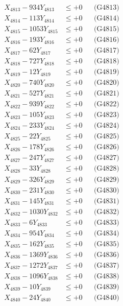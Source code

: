 \documentclass[a4paper,10pt]{article}
\begin{document}
{\begin{align}
X_{4813} - 934Y_{4813} &\leq +0 && \text{(G4813)} \\
X_{4814} - 113Y_{4814} &\leq +0 && \text{(G4814)} \\
X_{4815} - 1053Y_{4815} &\leq +0 && \text{(G4815)} \\
X_{4816} - 193Y_{4816} &\leq +0 && \text{(G4816)} \\
X_{4817} - 62Y_{4817} &\leq +0 && \text{(G4817)} \\
X_{4818} - 727Y_{4818} &\leq +0 && \text{(G4818)} \\
X_{4819} - 12Y_{4819} &\leq +0 && \text{(G4819)} \\
X_{4820} - 740Y_{4820} &\leq +0 && \text{(G4820)} \\
\allowbreak
X_{4821} - 527Y_{4821} &\leq +0 && \text{(G4821)} \\
X_{4822} - 939Y_{4822} &\leq +0 && \text{(G4822)} \\
X_{4823} - 105Y_{4823} &\leq +0 && \text{(G4823)} \\
X_{4824} - 233Y_{4824} &\leq +0 && \text{(G4824)} \\
X_{4825} - 22Y_{4825} &\leq +0 && \text{(G4825)} \\
X_{4826} - 178Y_{4826} &\leq +0 && \text{(G4826)} \\
X_{4827} - 247Y_{4827} &\leq +0 && \text{(G4827)} \\
X_{4828} - 33Y_{4828} &\leq +0 && \text{(G4828)} \\
X_{4829} - 326Y_{4829} &\leq +0 && \text{(G4829)} \\
X_{4830} - 231Y_{4830} &\leq +0 && \text{(G4830)} \\
\allowbreak
X_{4831} - 145Y_{4831} &\leq +0 && \text{(G4831)} \\
X_{4832} - 1030Y_{4832} &\leq +0 && \text{(G4832)} \\
X_{4833} - 6Y_{4833} &\leq +0 && \text{(G4833)} \\
X_{4834} - 954Y_{4834} &\leq +0 && \text{(G4834)} \\
X_{4835} - 162Y_{4835} &\leq +0 && \text{(G4835)} \\
X_{4836} - 1369Y_{4836} &\leq +0 && \text{(G4836)} \\
X_{4837} - 1272Y_{4837} &\leq +0 && \text{(G4837)} \\
X_{4838} - 1096Y_{4838} &\leq +0 && \text{(G4838)} \\
X_{4839} - 10Y_{4839} &\leq +0 && \text{(G4839)} \\
X_{4840} - 24Y_{4840} &\leq +0 && \text{(G4840)} \\

\end{align}}
\end{document}
